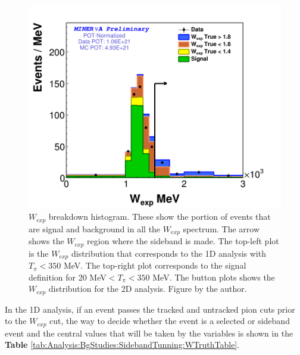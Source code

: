 \begin{figure}[!htb]
    \includegraphics[scale=0.2]{Figures/Chapter4/BGStudies/Breakdown_WSideband_wexp_fit_1PiTracked_PN_2D.png}
    
    \caption{$W_{exp}$ breakdown histogram. These  show the portion of events that are signal and background in all the $W_{exp}$ spectrum. The arrow shows the $W_{exp}$ region where the sideband is made. The top-left plot is the $W_{exp}$ distribution that corresponds to the 1D analysis with $T_\pi < 350$ MeV. The top-right plot corresponds to the signal definition for 20 MeV$ < T_\pi < 350$ MeV. The button plots shows the $W_{exp}$ distribution for the 2D analysis. Figure by the author.}
    \label{fig:Analysis:BgStudies:SidebandTunning:BreakdownWSideband} 
\end{figure}

In the 1D analysis, if an event passes the tracked and untracked pion cuts prior to the $W_{exp}$ cut, the way to decide whether the event is a selected or sideband event and the central values that will be taken by the variables is shown in the \textbf{Table} \ref{tab:Analysis:BgStudies:SidebandTunning:WTruthTable}.


